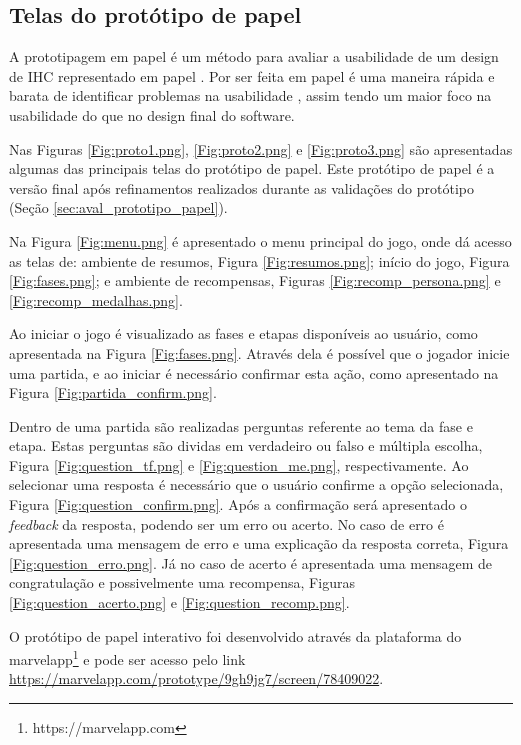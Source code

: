 \begin{apendicesenv}
\section{Telas do protótipo de papel}

{\color{textadded}
A prototipagem em papel é um método para avaliar a usabilidade de um design de IHC representado em papel \cite{barbosa_silva}. Por ser feita em papel é uma maneira rápida e barata de identificar problemas na usabilidade \cite{barbosa_silva}, assim tendo um maior foco na usabilidade do que no design final do software.

Nas Figuras \ref{Fig:proto1.png}, \ref{Fig:proto2.png} e \ref{Fig:proto3.png} são apresentadas algumas das principais telas do protótipo de papel. Este protótipo de papel é a versão final após refinamentos realizados durante as validações do protótipo (Seção \ref{sec:aval_prototipo_papel}).

Na Figura \ref{Fig:menu.png} é apresentado o menu principal do jogo, onde dá acesso as telas de: ambiente de resumos, Figura \ref{Fig:resumos.png}; início do jogo, Figura \ref{Fig:fases.png}; e ambiente de recompensas, Figuras \ref{Fig:recomp_persona.png} e \ref{Fig:recomp_medalhas.png}.

Ao iniciar o jogo é visualizado as fases e etapas disponíveis ao usuário, como apresentada na Figura \ref{Fig:fases.png}. Através dela é possível que o jogador inicie uma partida, e ao iniciar é necessário confirmar esta ação, como apresentado na Figura \ref{Fig:partida_confirm.png}.

Dentro de uma partida são realizadas perguntas referente ao tema da fase e etapa. Estas perguntas são dividas em verdadeiro ou falso e múltipla escolha, Figura \ref{Fig:question_tf.png} e \ref{Fig:question_me.png}, respectivamente. Ao selecionar uma resposta é necessário que o usuário confirme a opção selecionada, Figura \ref{Fig:question_confirm.png}. Após a confirmação será apresentado o \textit{feedback} da resposta, podendo ser um erro ou acerto. No caso de erro é apresentada uma mensagem de erro e uma explicação da resposta correta, Figura \ref{Fig:question_erro.png}. Já no caso de acerto é apresentada uma mensagem de congratulação e possivelmente uma recompensa, Figuras \ref{Fig:question_acerto.png} e \ref{Fig:question_recomp.png}.

O protótipo de papel interativo foi desenvolvido através da plataforma do marvelapp\footnote{https://marvelapp.com} e pode ser acesso pelo link \url{https://marvelapp.com/prototype/9gh9jg7/screen/78409022}.

}
\end{apendicesenv}
